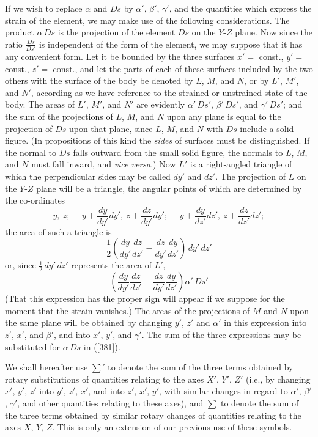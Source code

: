 \documentclass[12pt]{article}
\begin{document}
{If we wish to replace $\alpha$ and $Ds$ by $\alpha'$, $\beta'$, $\gamma'$, and the quantities which express the strain of the element, we may make use of the following considerations. The product $\alpha \, Ds$ is the projection of the element $Ds$ on the $Y$-$Z$ plane. Now since the ratio $\frac{Ds}{Ds'}$ is independent of the form of the element, we may suppose that it has any convenient form. Let it be bounded by the three surfaces $x'=$ const., $y'=$ const., $z'=$ const., and let the parts of each of these surfaces included by the two others with the surface of the body be denoted by $L$, $M$, and $N$, or by $L'$, $M'$, and $N'$, according as we have reference to the strained or unstrained state of the body. The areas of $L'$, $M'$, and $N'$ are evidently $\alpha'\,Ds'$, $\beta'\,Ds'$, and $\gamma'\,Ds'$; and the sum of the projections of $L$, $M$, and $N$ upon any plane is equal to the projection of $Ds$ upon that plane, since $L$, $M$, and $N$ with $Ds$ include a solid figure. (In propositions of this kind the \textit{sides} of surfaces must be distinguished. If the normal to $Ds$ falls outward from the small solid figure, the normals to $L$, $M$, and $N$ must fall inward, and \textit{vice versa}.) Now $L'$ is a right-angled triangle of which the perpendicular sides may be called $dy'$ and $dz'$. The projection of $L$ on the $Y$-$Z$ plane will be a triangle, the angular points of which are determined by the co-ordinates
$$y, \  z; \ \ \ \ \ \ y+ \frac{dy}{dy'}dy', \ z+\frac{dz}{dy'}dy'; \ \ \ \ \ \ y + \frac{dy}{dz'}d z', \  z+ \frac{dz}{dz'}dz';$$
the area of such a triangle is
$$\frac{1}{2}\left(\frac{dy}{dy'} \frac{dz}{dz'} -  \frac{dz}{dy'} \frac{dy}{dz'} \right) \,dy' \,dz'$$
or, since $\frac{1}{2} \, dy' \, dz'$ represents the area of $L'$,
$$
\left(\frac{dy}{dy'}\frac{dz}{dz'}-\frac{dz}{dy'}\frac{dy}{dz'} \right)\alpha'\, Ds'$$
(That this expression has the proper sign will appear if we suppose for the moment that the strain vanishes.) The areas of the projections of $M$ and $N$ upon the same plane will be obtained by changing $y'$, $z'$ and $\alpha'$ in this expression into $z'$, $x'$, and $\beta'$, and into $x'$, $y'$, and $\gamma'$. The sum of the three expressions may be substituted for $\alpha \,Ds$ in (\ref{381}).


We shall hereafter use $\sum\nolimits'$ to denote the sum of the three terms obtained by rotary substitutions of quantities relating to the axes $X'$, $Y'$, $Z'$ (i.e., by changing $x'$, $y'$, $z'$ into $y'$, $z'$, $x'$, and into $z'$, $x'$, $y'$, with similar changes in regard to $\alpha'$, $\beta'$, $\gamma'$, and other quantities relating to these axes), and $\sum$ to denote the sum of the three terms obtained by similar rotary changes of quantities relating to the axes $X$, $Y$, $Z$. This is only an extension of our previous use of these symbols.


}
\end{document}
